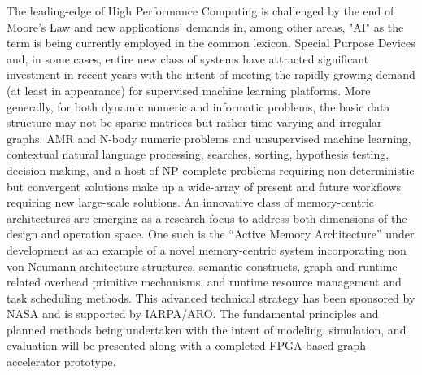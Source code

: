 The leading-edge of High Performance Computing is challenged by the end of Moore's Law and new applications’ demands in, among other areas, "AI" as the term is being currently employed in the common lexicon. Special Purpose Devices and, in some cases, entire new class of systems have attracted significant investment in recent years with the intent of meeting the rapidly growing demand (at least in appearance) for supervised machine learning platforms. More generally, for both dynamic numeric and informatic problems, the basic data structure may not be sparse matrices but rather time-varying and irregular graphs. AMR and N-body numeric problems and unsupervised machine learning, contextual natural language processing, searches, sorting, hypothesis testing, decision making, and a host of NP complete problems requiring non-deterministic but convergent solutions make up a wide-array of present and future workflows requiring new large-scale solutions. An innovative class of memory-centric architectures are emerging as a research focus to address both dimensions of the design and operation space. One such is the “Active Memory Architecture” under development as an example of a novel memory-centric system incorporating non von Neumann architecture structures, semantic constructs, graph and runtime related overhead primitive mechanisms, and runtime resource management and task scheduling methods. This advanced technical strategy has been sponsored by NASA and is supported by IARPA/ARO. The fundamental principles and planned methods being undertaken with the intent of modeling, simulation, and evaluation will be presented along with a completed FPGA-based graph accelerator prototype.